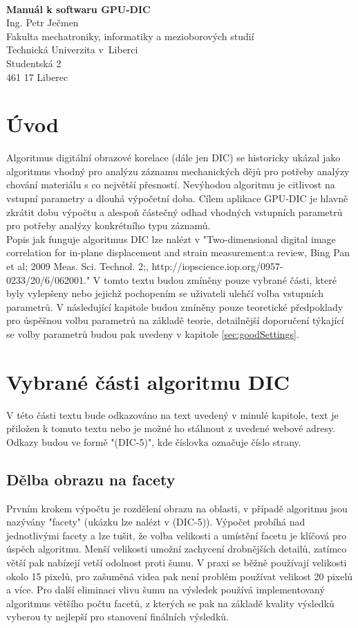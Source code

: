 \documentclass[a4paper,12pt]{article}
\date{September 13, 2013}
\begin{document}
\logo
\\\vspace{6pt}
\begin{center}
\large{\bfseries Manuál k softwaru GPU-DIC}
\\\vspace{1pc}
\small{
Ing. Petr Ječmen
\\\vspace{1pc}
Fakulta mechatroniky, informatiky a mezioborových studií\\
Technická Univerzita v~Liberci\\
Studentská 2\\
461 17 Liberec}
\end{center}
\newpage
\tableofcontents
\newpage
\section{Úvod}
Algoritmus digitální obrazové korelace (dále jen DIC) se historicky ukázal jako algoritmus vhodný pro analýzu záznamu mechanických dějů pro potřeby analýzy chování materiálu s co největší přesností. Nevýhodou algoritmu je citlivost na vstupní parametry a dlouhá výpočetní doba. Cílem aplikace GPU-DIC je  hlavně zkrátit dobu výpočtu a alespoň částečný odhad vhodných vstupních parametrů pro potřeby analýzy konkrétního typu záznamů.\\
Popis jak funguje algoritmus DIC lze nalézt v "Two-dimensional digital image correlation for in-plane displacement and strain measurement:a review, Bing Pan et al; 2009 Meas. Sci. Technol. 2;, http://iopscience.iop.org/0957-0233/20/6/062001." V tomto textu budou zmíněny pouze vybrané části, které byly vylepšeny nebo jejichž pochopením se uživateli ulehčí volba vstupních parametrů. V následující kapitole budou zmíněny pouze teoretické předpoklady pro úspěšnou volbu parametrů na základě teorie, detailnější doporučení týkající se volby parametrů budou pak uvedeny v kapitole \ref{sec:goodSettings}.
\newpage
\section{Vybrané části algoritmu DIC}
V této části textu bude odkazováno na text uvedený v minulé kapitole, text je přiložen k tomuto textu nebo je možné ho stáhnout z uvedené webové adresy. Odkazy budou ve formě "(DIC-5)", kde číslovka označuje číslo strany.
\subsection{Dělba obrazu na facety}
Prvním krokem výpočtu je rozdělení obrazu na oblasti, v případě algoritmu jsou nazývány "facety" (ukázku lze nalézt v (DIC-5)). Výpočet probíhá nad jednotlivými facety a lze tušit, že volba velikosti a umístění facetu je klíčová pro úspěch algoritmu. Menší velikosti umožní zachycení drobnějších detailů, zatímco větší pak nabízejí vetší odolnost proti šumu. V praxi se běžně používají velikosti okolo 15 pixelů, pro zašuměná videa pak není problém používat velikost 20 pixelů a více. Pro další eliminaci vlivu šumu na výsledek používá implementovaný algoritmus většího počtu facetů, z kterých se pak na základě kvality výsledků vyberou ty nejlepší pro stanovení finálních výsledků.
\end{document}
